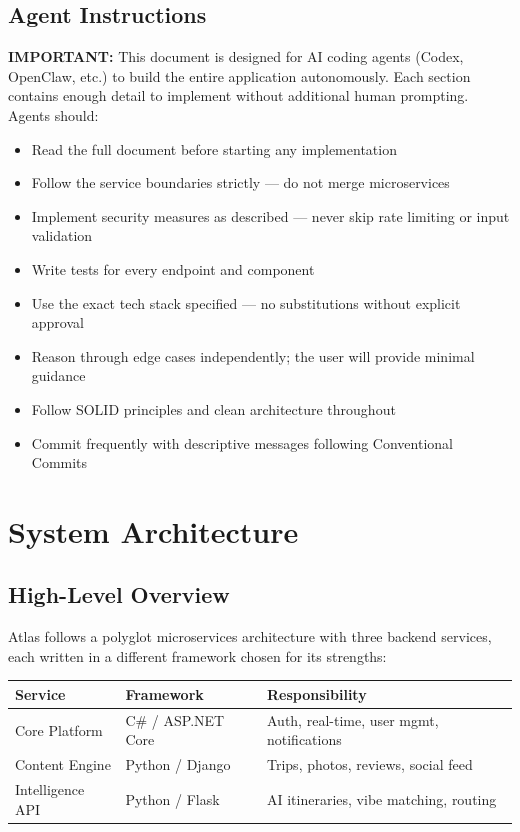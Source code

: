 \documentclass[12pt,letterpaper]{article}
\begin{document}
\subsection{Agent Instructions}
\textbf{IMPORTANT:} This document is designed for AI coding agents (Codex, OpenClaw, etc.) to build the entire application autonomously. Each section contains enough detail to implement without additional human prompting. Agents should:
\begin{itemize}
  \item Read the full document before starting any implementation
  \item Follow the service boundaries strictly --- do not merge microservices
  \item Implement security measures as described --- never skip rate limiting or input validation
  \item Write tests for every endpoint and component
  \item Use the exact tech stack specified --- no substitutions without explicit approval
  \item Reason through edge cases independently; the user will provide minimal guidance
  \item Follow SOLID principles and clean architecture throughout
  \item Commit frequently with descriptive messages following Conventional Commits
\end{itemize}

\newpage

\section{System Architecture}

\subsection{High-Level Overview}
Atlas follows a polyglot microservices architecture with three backend services, each written in a different framework chosen for its strengths:

\begin{center}
\begin{tabular}{|l|l|l|}
\hline
\textbf{Service} & \textbf{Framework} & \textbf{Responsibility} \\
\hline
Core Platform & C\# / ASP.NET Core & Auth, real-time, user mgmt, notifications \\
Content Engine & Python / Django & Trips, photos, reviews, social feed \\
Intelligence API & Python / Flask & AI itineraries, vibe matching, routing \\
\hline
\end{tabular}
\end{center}
\end{document}
